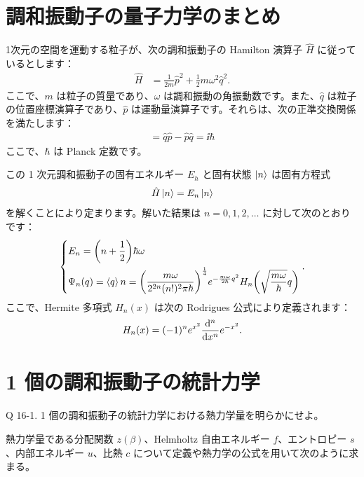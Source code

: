 \documentclass[uplatex,dvipdfmx,a4paper,11pt]{jlreq}
\theoremstyle{definition}
\begin{document}
\section{調和振動子の量子力学のまとめ}

1次元の空間を運動する粒子が、次の調和振動子の Hamilton 演算子 $\hat{H}$ に従っているとします：
\begin{align}
  \hat{H} & = \frac{1}{2m}\hat{p}^2 + \frac{1}{2}m\omega^2\hat{q}^2.
\end{align}
ここで、$m$ は粒子の質量であり、$\omega$ は調和振動の角振動数です。また、$\hat{q}$ は粒子の位置座標演算子であり、$\hat{p}$ は運動量演算子です。それらは、次の正準交換関係を満たします：
\begin{align}
  [\hat{q}, \hat{p}] = \hat{q}\hat{p} - \hat{p}\hat{q} = \ii\hbar
\end{align}
ここで、$\hbar$ は Planck 定数です。

この 1 次元調和振動子の固有エネルギー $E_h$ と固有状態 $\ket{n}$ は固有方程式
\begin{align}
  \hat{H}\ket{n} = E_n\ket{n}
\end{align}
を解くことにより定まります。解いた結果は $n = 0, 1, 2, \ldots$ に対して次のとおりです：
\begin{align}
  \begin{dcases}
    E_n        = \qty(n + \frac{1}{2})\hbar\omega \\
    \Psi_n(q) = \braket{q}{n} = \qty(\frac{m\omega}{2^{2n}(n!)^2\pi\hbar})^{\frac{1}{4}}e^{-\frac{m\omega}{2\hbar}q^2}H_n\qty(\sqrt{\frac{m\omega}{\hbar}}q)
  \end{dcases}.
\end{align}
ここで、Hermite 多項式 $H_n(x)$ は次の Rodrigues 公式により定義されます：
\begin{align}
  H_n(x) = (-1)^ne^{x^2}\dv[n]{x}e^{-x^2}.
\end{align}

\section{1 個の調和振動子の統計力学}
\begin{itembox}[l]{Q 16-1.}
  1 個の調和振動子の統計力学における熱力学量を明らかにせよ。
\end{itembox}

熱力学量である分配関数 $z(\beta)$、Helmholtz 自由エネルギー $f$、エントロピー $s$、内部エネルギー $u$、比熱 $c$ について定義や熱力学の公式を用いて次のように求まる。
\end{document}
